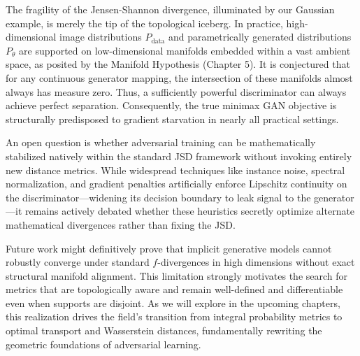 \begin{horizon}
The fragility of the Jensen-Shannon divergence, illuminated by our Gaussian example, is merely the tip of the topological iceberg. In practice, high-dimensional image distributions $P_{\text{data}}$ and parametrically generated distributions $P_\theta$ are supported on low-dimensional manifolds embedded within a vast ambient space, as posited by the Manifold Hypothesis (Chapter 5). It is conjectured that for any continuous generator mapping, the intersection of these manifolds almost always has measure zero. Thus, a sufficiently powerful discriminator can always achieve perfect separation. Consequently, the true minimax GAN objective is structurally predisposed to gradient starvation in nearly all practical settings.

An open question is whether adversarial training can be mathematically stabilized natively within the standard JSD framework without invoking entirely new distance metrics. While widespread techniques like instance noise, spectral normalization, and gradient penalties artificially enforce Lipschitz continuity on the discriminator---widening its decision boundary to leak signal to the generator---it remains actively debated whether these heuristics secretly optimize alternate mathematical divergences rather than fixing the JSD.

Future work might definitively prove that implicit generative models cannot robustly converge under standard $f$-divergences in high dimensions without exact structural manifold alignment. This limitation strongly motivates the search for metrics that are topologically aware and remain well-defined and differentiable even when supports are disjoint. As we will explore in the upcoming chapters, this realization drives the field's transition from integral probability metrics to optimal transport and Wasserstein distances, fundamentally rewriting the geometric foundations of adversarial learning.
\end{horizon}

